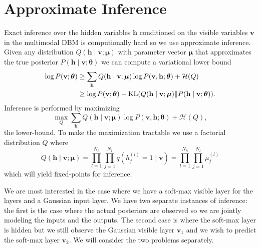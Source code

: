 \documentclass{article} %
\begin{document}
\section{Approximate Inference}



Exact inference over the hidden variables $\mathbf{h}$
conditioned on the visible variables $\mathbf{v}$ in the multimodal DBM is computionally hard so we use approximate inference. Given any distribution $Q(\mathbf{h}\mid\mathbf{v};\boldsymbol{\mu})$ with parameter vector $\boldsymbol{\mu}$
that approximates the true posterior $P(\mathbf{h}\mid\mathbf{v};\boldsymbol{\theta})$ we can compute a variational lower bound
\begin{align}
  \log P(\mathbf{v};\boldsymbol{\theta}) &\geq \sum_{\mathbf{h}}Q(\mathbf{h}\mid \mathbf{v};\boldsymbol{\mu})\log P(\mathbf{v},\mathbf{h};\boldsymbol{\theta}) + \mathcal{H}(Q) \notag\\
 &\geq \log P(\mathbf{v};\boldsymbol{\theta}) - \operatorname{KL}(Q(\mathbf{h}\mid \mathbf{v};\boldsymbol{\mu})\| P(\mathbf{h}\mid \mathbf{v};\boldsymbol{\theta})).
\end{align}
Inference is performed by maximizing
\begin{equation}
\max_Q \sum_{\mathbf{h}}Q(\mathbf{h}\mid \mathbf{v};\boldsymbol{\mu})\log P(\mathbf{v},\mathbf{h};\boldsymbol{\theta}) + \mathcal{H}(Q),
\end{equation}
the lower-bound.  To make the maximization tractable we use a factorial distribution $Q$ where 
\begin{equation}
Q(\mathbf{h}\mid \mathbf{v};\boldsymbol{\mu}) = \prod_{l=1}^{N_h}\prod_{j=1}^{N_l}q(h_j^{(l)}=1\mid \mathbf{v}) = \prod_{l=1}^{N_h}\prod_{j=1}^{N_l}\mu_j^{(l)}
\end{equation}
which will yield fixed-points for inference.

We are most interested in the case where we have a soft-max visible
layer for the layers and a Gaussian input layer.  We have two separate
instances of inference: the first is the case where the actual
posteriors are observed so we are jointly modeling the inputs and the
outputs.  The second case is where the soft-max layer is hidden but we
still observe the Gaussian visible layer $\mathbf{v}_1$ and we wish to predict the
soft-max layer $\mathbf{v}_2$.  We will consider the two problems
separately.
\end{document}
